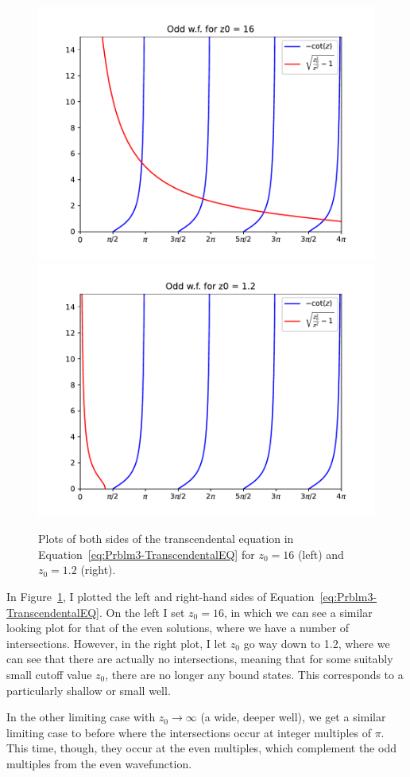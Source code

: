 \begin{figure}[ht]
    \centering
    \includegraphics[width=0.4\linewidth]{./res/Prblm3_1.pdf}
    \hspace*{3mm}
    \includegraphics[width=0.4\linewidth]{./res/Prblm3_2.pdf}
    \caption{Plots of both sides of the transcendental equation in Equation~\eqref{eq:Prblm3-TranscendentalEQ} for $z_0 = 16$ (left) and $z_0 = 1.2$ (right).}
    \label{fig:Prblm3-TranscendentalPlots}
\end{figure}

In Figure~\ref{fig:Prblm3-TranscendentalPlots}, I plotted the left and right-hand sides of Equation~\eqref{eq:Prblm3-TranscendentalEQ}. On the left I set $z_0=16$, in which we can see a similar looking plot for that of the even solutions, where we have a number of intersections. However, in the right plot, I let $z_0$ go way down to 1.2, where we can see that there are actually no intersections, meaning that for some suitably small cutoff value $z_0$, there are no longer any bound states. This corresponds to a particularly shallow or small well.

In the other limiting case with $z_0 \rightarrow \infty$ (a wide, deeper well), we get a similar limiting case to before where the intersections occur at integer multiples of $\pi$. This time, though, they occur at the even multiples, which complement the odd multiples from the even wavefunction.